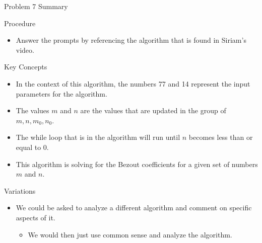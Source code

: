 \begin{summary}{Problem 7 Summary}
    \begin{statement}{Procedure}
        \begin{itemize}
            \item Answer the prompts by referencing the algorithm that is found in Siriam's video.
        \end{itemize}
    \end{statement}
    \begin{statement}{Key Concepts}
        \begin{itemize}
            \item In the context of this algorithm, the numbers 77 and 14 represent the input parameters for the algorithm.
            \item The values $m$ and $n$ are the values that are updated in the group of $m,n,m_{0},n_{0}$.
            \item The while loop that is in the algorithm will run until $n$ becomes less than or equal to 0.
            \item This algorithm is solving for the Bezout coefficients for a given set of numbers $m$ and $n$.
        \end{itemize}
    \end{statement}
    \begin{statement}{Variations}
        \begin{itemize}
            \item We could be asked to analyze a different algorithm and comment on specific aspects of it.
            \begin{itemize}
                \item We would then just use common sense and analyze the algorithm.
            \end{itemize}
        \end{itemize}
    \end{statement}
\end{summary}

